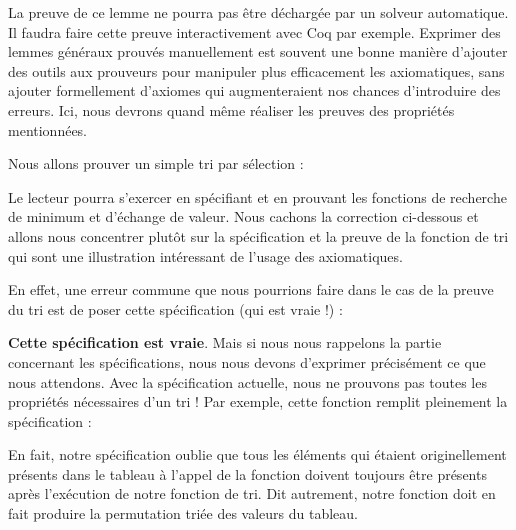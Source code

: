 La preuve de ce lemme ne pourra pas être déchargée par un solveur automatique. Il
faudra faire cette preuve interactivement avec Coq par exemple. Exprimer des 
lemmes généraux prouvés manuellement est souvent une bonne manière d'ajouter des
outils aux prouveurs pour manipuler plus efficacement les axiomatiques, sans 
ajouter formellement d'axiomes qui augmenteraient nos chances d'introduire des
erreurs. Ici, nous devrons quand même réaliser les preuves des propriétés 
mentionnées.





Nous allons prouver un simple tri par sélection :






Le lecteur pourra s'exercer en spécifiant et en prouvant les fonctions de 
recherche de minimum et d'échange de valeur. Nous cachons la correction 
ci-dessous et allons nous concentrer plutôt sur la spécification et la preuve de
la fonction de tri qui sont une illustration intéressant de l'usage des
axiomatiques.



\begin{Spoiler}
\end{Spoiler}


En effet, une erreur commune que nous pourrions faire dans le cas de la preuve 
du tri est de poser cette spécification (qui est vraie !) :






\textbf{Cette spécification est vraie}. Mais si nous nous rappelons la 
partie concernant les spécifications, nous nous devons d'exprimer précisément ce
que nous attendons. Avec la spécification actuelle, nous ne prouvons pas toutes
les propriétés nécessaires d'un tri ! Par exemple, cette fonction remplit 
pleinement la spécification :






En fait, notre spécification oublie que tous les éléments qui étaient 
originellement présents dans le tableau à l'appel de la fonction doivent
toujours être présents après l'exécution de notre fonction de tri. Dit
autrement, notre fonction doit en fait produire la permutation triée des
valeurs du tableau.



